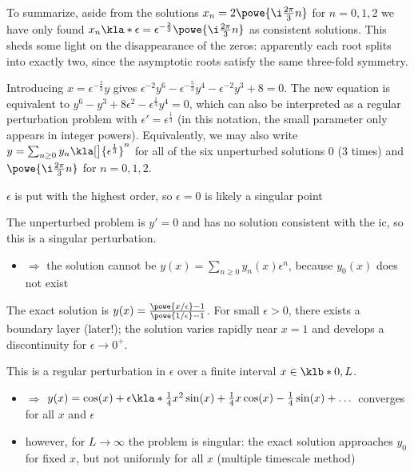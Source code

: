 \documentclass[english, parskip=full]{scrbook}
\newcommand{\definition}[2]{\begin{tcolorbox}[colback=colorbackgrounddefinition,colframe=colordefinition, breakable,enhanced,title=\textbf{#1}.]#2\end{tcolorbox}}
\newcommand{\note}[1]{\begin{tcolorbox}[colback=colorbackgroundnote,colframe=colornote, breakable,enhanced]#1\end{tcolorbox}}
\newcommand{\example}[3]{\begin{tcolorbox}[colback=colorbackgroundexample,colframe=colorexample, breakable,enhanced,title={\textbf{#1}: #2.}]#3\end{tcolorbox}}
\begin{document}
To summarize, aside from the solutions $x_n = 2\powe{\i \frac{2\pi}{3} n}$ for $n=0,1,2$ we have only found $x_n\kla*{\epsilon} = \epsilon^{-\frac{2}{3}} \powe{\i \frac{2\pi}{3}n}$ as consistent solutions.
This sheds some light on the disappearance of the zeros: apparently each root splits into exactly two, since the asymptotic roots satisfy the same three-fold symmetry.

Introducing $x = \epsilon^{-\frac{2}{3}} y$ gives $\epsilon^{-2} y^6 - \epsilon^{-\frac{5}{3}} y^4 - \epsilon^{-2} y^3 + 8 = 0$.
The new equation is equivalent to $y^6-y^3+8\epsilon^2 - \epsilon^{\frac{1}{3}} y^4 = 0$, which can also be interpreted as a regular perturbation problem with $\epsilon' = \epsilon^\frac{1}{3}$ (in this notation, the small parameter only appears in integer powers).
Equivalently, we may also write $y = \sum_{n\ge 0} y_n \kla[\big]{\epsilon^\frac{1}{3}}^n$ for all of the six unperturbed solutions $0$ (3 times) and $\powe{\i\frac{2\pi}{3}n}$ for $n=0,1,2$.

\example{Singular Perturbation}{$\epsilon y'' = y'$ with $y(0)=0$ and $y(1)=1$}{\note{$\epsilon$ is put with the highest order, so $\epsilon=0$ is likely a singular point}
The unperturbed problem is $y'=0$ and has no solution consistent with the \gls{ic}, so this is a singular perturbation.
\begin{itemize}
\item $\Rightarrow$ the solution cannot be $y(x) = \sum_{n\ge 0} y_n(x)\epsilon^n$, because $y_0(x)$ does not exist
\end{itemize}
\definition{Boundary Layer Theory}{The exact solution is $y(x) = \frac{\powe{x/\epsilon}-1}{\powe{1/\epsilon} - 1}$.
For small $\epsilon>0$, there exists a boundary layer (later!); the solution varies rapidly near $x=1$ and develops a discontinuity for $\epsilon\rightarrow 0^+$.}
}
\example{\gls{ivp}}{$y''+(1-\epsilon x)y=0$ with $y(0)=1$ and $y'(0)=0$}{This is a regular perturbation in $\epsilon$ over a finite interval $x\in\klb*{0,L}$.
\begin{itemize}
\item $\Rightarrow$ $y(x) = \cos(x) + \epsilon \kla*{\frac{1}{4}x^2 \sin(x) + \frac{1}{4}x\cos (x) - \frac{1}{4}\sin(x)} + \dots$ converges for all $x$ and $\epsilon$
\item however, for $L\rightarrow \infty$ the problem is singular: the exact solution approaches $y_0$ for fixed $x$, but not uniformly for all $x$ (multiple timescale method)
\end{itemize}
}
\end{document}
